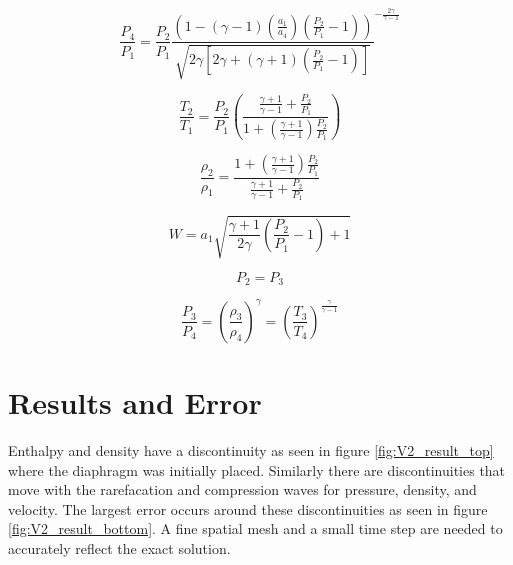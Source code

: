     \begin{equation}
    \label{eq:ref1_7.94}
    	\frac{P_{4}}{P_{1}} = \frac{P_{2}}{P_{1}} \frac{
    	\left( 1 - (\gamma-1)(\frac{a_{1}}{a_{4}})(\frac{P_{2}}{P_{1}} -1) \right) }
    	{\sqrt{2 \gamma \left[ 2 \gamma + (\gamma +1)(\frac{P_{2}}{P_{1}} -1)\right]}}^{
    	- \frac{2 \gamma}{\gamma - 1}}
    \end{equation}
    
    \begin{equation}
    	\frac{T_{2}}{T_{1}} = \frac{P_{2}}{P_{1}} \left(
    	\frac{\frac{\gamma + 1}{\gamma - 1} + \frac{P_{2}}{P_{1}}}
    	{1 + (\frac{\gamma +1}{\gamma - 1}) \frac{P_{2}}{P_{1}}} \right)
    \end{equation}
    
    \begin{equation}
    	\frac{\rho_{2}}{\rho_{1}} =
    	\frac{1 + (\frac{\gamma + 1}{\gamma - 1}) \frac{P_{2}}{P_{1}}}
    	{\frac{\gamma + 1}{\gamma - 1} + \frac{P_{2}}{P_{1}}} 
    \end{equation}
    
    \begin{equation}
    	W = a_{1} \sqrt{ \frac{\gamma + 1}{2 \gamma} 
    	                 \left( \frac{P_{2}}{P_{1}} -1 \right) +1 }
    \end{equation}
    
    \begin{equation}
    	P_{2} = P_{3}
    \end{equation}
    
    \begin{equation}
    	\frac{P_{3}}{P_{4}} = 
    	\left( \frac{\rho_{3}}{\rho_{4}} \right)^{\gamma} =
    	\left( \frac{T_{3}}{T_{4}} \right)^{\frac{\gamma}{\gamma -1}}
    \end{equation}
    
    \section{Results and Error}
    
    Enthalpy and density have a discontinuity as seen in figure
    \ref{fig:V2_result_top} where the diaphragm was initially placed. Similarly
    there are discontinuities that move with the rarefacation and compression
    waves for pressure, density, and velocity. The largest error occurs around
    these discontinuities as seen in figure \ref{fig:V2_result_bottom}. A 
    fine spatial mesh and a small time step are needed to accurately reflect the
    exact solution.
    
